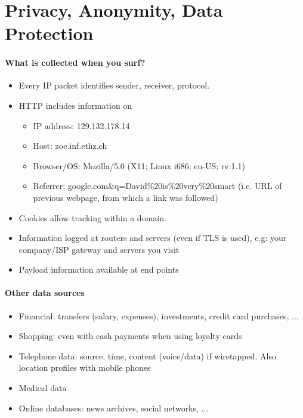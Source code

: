 \section{Privacy, Anonymity, Data Protection}

\paragraph{What is collected when you surf?}

\begin{itemize}
    \item Every IP packet identifies sender, receiver, protocol.
    \item HTTP includes information on
    \begin{itemize}
        \item IP address: 129.132.178.14
        \item Host: zoe.inf.ethz.ch
        \item Browser/OS: Mozilla/5.0 (X11; Linux i686; en-US; rv:1.1)
        \item Referrer: google.com\&q=David\%20is\%20very\%20smart (i.e. URL of previous webpage, from which a link was followed)
    \end{itemize}
    \item Cookies allow tracking within a domain.
    \item Information logged at routers and servers (even if TLS is used), e.g: your company/ISP gateway and servers you visit
    \item Payload information available at end points
\end{itemize}

\paragraph{Other data sources}

\begin{itemize}
    \item Financial: transfers (salary, expenses), investments, credit card purchases, ...
    \item Shopping: even with cash payments when using loyalty cards
    \item Telephone data: source, time, content (voice/data) if wiretapped. Also location profiles with mobile phones
    \item Medical data
    \item Online databases: news archives, social networks, ...
\end{itemize}


